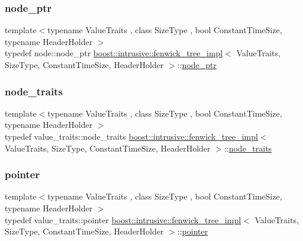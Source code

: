 \subsubsection{\texorpdfstring{node\+\_\+ptr}{node\_ptr}}
{\footnotesize\ttfamily template$<$typename Value\+Traits , class Size\+Type , bool Constant\+Time\+Size, typename Header\+Holder $>$ \\
typedef node\+::node\+\_\+ptr \hyperlink{classboost_1_1intrusive_1_1fenwick__tree__impl}{boost\+::intrusive\+::fenwick\+\_\+tree\+\_\+impl}$<$ Value\+Traits, Size\+Type, Constant\+Time\+Size, Header\+Holder $>$\+::\hyperlink{classboost_1_1intrusive_1_1fenwick__tree__impl_a6546b8d5a2d043e99e5e28853a8da248}{node\+\_\+ptr}}

\mbox{\label{classboost_1_1intrusive_1_1fenwick__tree__impl_a6b28754cf23051d44f0caae912a22b04}} 
\subsubsection{\texorpdfstring{node\+\_\+traits}{node\_traits}}
{\footnotesize\ttfamily template$<$typename Value\+Traits , class Size\+Type , bool Constant\+Time\+Size, typename Header\+Holder $>$ \\
typedef value\+\_\+traits\+::node\+\_\+traits \hyperlink{classboost_1_1intrusive_1_1fenwick__tree__impl}{boost\+::intrusive\+::fenwick\+\_\+tree\+\_\+impl}$<$ Value\+Traits, Size\+Type, Constant\+Time\+Size, Header\+Holder $>$\+::\hyperlink{classboost_1_1intrusive_1_1fenwick__tree__impl_a6b28754cf23051d44f0caae912a22b04}{node\+\_\+traits}}

\mbox{\label{classboost_1_1intrusive_1_1fenwick__tree__impl_a5900d4b71e9c5715db38a848acbe270b}} 
\subsubsection{\texorpdfstring{pointer}{pointer}}
{\footnotesize\ttfamily template$<$typename Value\+Traits , class Size\+Type , bool Constant\+Time\+Size, typename Header\+Holder $>$ \\
typedef value\+\_\+traits\+::pointer \hyperlink{classboost_1_1intrusive_1_1fenwick__tree__impl}{boost\+::intrusive\+::fenwick\+\_\+tree\+\_\+impl}$<$ Value\+Traits, Size\+Type, Constant\+Time\+Size, Header\+Holder $>$\+::\hyperlink{classboost_1_1intrusive_1_1fenwick__tree__impl_a5900d4b71e9c5715db38a848acbe270b}{pointer}}

